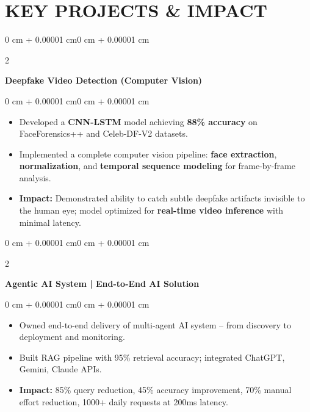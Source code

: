 \documentclass[10pt, letterpaper]{article}
\newenvironment{highlights}{
    \begin{itemize}[
        topsep=0.03 cm,
        parsep=0.02 cm,
        partopsep=0pt,
        itemsep=0.02 cm,
        leftmargin=0 cm + 8pt
    ]
}{
    \end{itemize}
}
\newenvironment{onecolentry}{
    \begin{adjustwidth}{0 cm + 0.00001 cm}{0 cm + 0.00001 cm}
}{
    \end{adjustwidth}
}
\newenvironment{twocolentry}[2][]{
    \onecolentry
    \def\secondColumn{#2}
    \setcolumnwidth{\fill, 3.5 cm}
    \begin{paracol}{2}
}{
    \switchcolumn \raggedleft \secondColumn
    \end{paracol}
    \endonecolentry
}
\begin{document}
    \section{KEY PROJECTS \& IMPACT}

    \begin{twocolentry}{2025}
        \textbf{Deepfake Video Detection (Computer Vision)}
    \end{twocolentry}
    \vspace{0.03 cm}
    \begin{onecolentry}
        \begin{highlights}
            \item Developed a \textbf{CNN-LSTM} model achieving \textbf{88\% accuracy} on FaceForensics++ and Celeb-DF-V2 datasets.
            \item Implemented a complete computer vision pipeline: \textbf{face extraction}, \textbf{normalization}, and \textbf{temporal sequence modeling} for frame-by-frame analysis.
            \item \textbf{Impact:} Demonstrated ability to catch subtle deepfake artifacts invisible to the human eye; model optimized for \textbf{real-time video inference} with minimal latency.
        \end{highlights}
    \end{onecolentry}

    \vspace{0.06 cm}

    \begin{twocolentry}{2024}
        \textbf{Agentic AI System | End-to-End AI Solution}
    \end{twocolentry}
    \vspace{0.03 cm}
    \begin{onecolentry}
        \begin{highlights}
            \item Owned end-to-end delivery of multi-agent AI system – from discovery to deployment and monitoring.
            \item Built RAG pipeline with 95\% retrieval accuracy; integrated ChatGPT, Gemini, Claude APIs.
            \item \textbf{Impact:} 85\% query reduction, 45\% accuracy improvement, 70\% manual effort reduction, 1000+ daily requests at 200ms latency.
        \end{highlights}
    \end{onecolentry}

    \vspace{0.06 cm}
\end{document}
